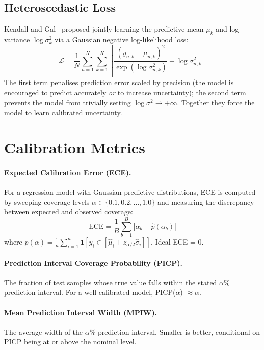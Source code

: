 \documentclass[12pt, a4paper, oneside]{report}
\begin{document}
\subsection{Heteroscedastic Loss}

Kendall and Gal~\cite{kendall2017} proposed jointly learning the predictive mean $\mu_k$ and log-variance $\log\sigma^2_k$ via a Gaussian negative log-likelihood loss:
\begin{equation}
  \mathcal{L} = \frac{1}{N}\sum_{n=1}^N \sum_{k=1}^K \left[
    \frac{(y_{n,k} - \mu_{n,k})^2}{\exp(\log\sigma^2_{n,k})}
    + \log\sigma^2_{n,k}
  \right]
  \label{eq:nll_loss}
\end{equation}
The first term penalises prediction error scaled by precision (the model is encouraged to predict accurately \emph{or} to increase uncertainty); the second term prevents the model from trivially setting $\log\sigma^2 \to +\infty$. Together they force the model to learn calibrated uncertainty.

\section{Calibration Metrics}

\paragraph{Expected Calibration Error (ECE).} For a regression model with Gaussian predictive distributions, ECE is computed by sweeping coverage levels $\alpha \in \{0.1, 0.2,\ldots,1.0\}$ and measuring the discrepancy between expected and observed coverage:
\begin{equation}
  \mathrm{ECE} = \frac{1}{B}\sum_{b=1}^{B} \left|\alpha_b - \hat{p}(\alpha_b)\right|
\end{equation}
where $\hat{p}(\alpha) = \frac{1}{n}\sum_{i=1}^n \mathbf{1}\left[y_i \in [\hat\mu_i \pm z_{\alpha/2}\hat\sigma_i]\right]$. Ideal ECE = 0.

\paragraph{Prediction Interval Coverage Probability (PICP).} The fraction of test samples whose true value falls within the stated $\alpha$\% prediction interval. For a well-calibrated model, PICP($\alpha$) $\approx \alpha$.

\paragraph{Mean Prediction Interval Width (MPIW).} The average width of the $\alpha$\% prediction interval. Smaller is better, conditional on PICP being at or above the nominal level.
\end{document}
